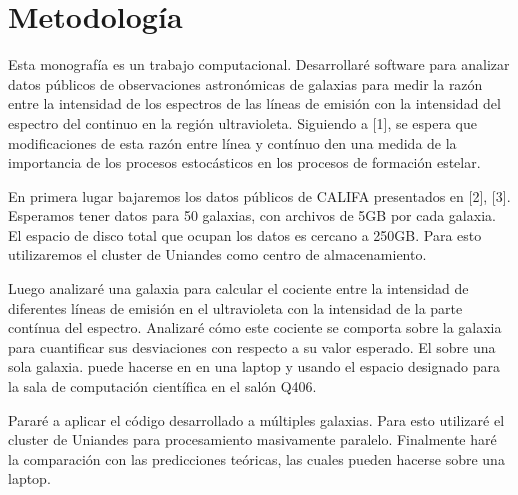 \documentclass[12pt]{article}
\begin{document}
\section{Metodolog\'ia}



Esta monograf\'ia es un trabajo computacional. Desarrollar\'e software
para analizar datos p\'ublicos de observaciones astron\'omicas de
galaxias para medir la raz\'on entre la intensidad de los espectros de las
l\'ineas de emisi\'on con la intensidad del espectro del continuo en
la regi\'on ultravioleta.  Siguiendo a [1], se espera que
modificaciones de esta raz\'on entre l\'inea y cont\'inuo den una medida de la importancia de
 los procesos estoc\'asticos en los procesos de formaci\'on estelar.

En primera lugar bajaremos los datos p\'ublicos de CALIFA presentados
en [2], [3].
Esperamos tener datos para 50 galaxias, con archivos de 5GB por cada
galaxia.
El espacio de disco total que ocupan los datos es cercano a 250GB.
Para esto utilizaremos el cluster de Uniandes como centro de
almacenamiento.

Luego analizar\'e una galaxia para calcular el cociente entre
la intensidad de diferentes l\'ineas de emisi\'on en el ultravioleta
con la intensidad de la parte cont\'inua del espectro.
Analizar\'e c\'omo este cociente se comporta sobre la galaxia para
cuantificar sus desviaciones con respecto a su valor esperado.
El sobre una sola galaxia. puede hacerse en  en una laptop y usando el
espacio designado para la sala de computaci\'on cient\'ifica en el
sal\'on Q406.

Parar\'e a aplicar el c\'odigo desarrollado a m\'ultiples galaxias.
Para esto utilizar\'e el cluster de Uniandes para procesamiento masivamente
paralelo.
Finalmente har\'e la comparaci\'on con las predicciones te\'oricas,
las cuales pueden hacerse sobre una laptop.


\end{document}
